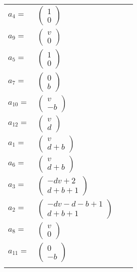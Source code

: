 \documentclass[1p]{elsarticle_modified}
\theoremstyle{definition}
\begin{document}
\begin{tabular}{m{7pt} m{180pt} m{7pt} m{180pt} }
\flushright $a_{4}=$&$\begin{pmatrix}1\\0\end{pmatrix}$ \\
\flushright $a_{9}=$&$\begin{pmatrix}v\\0\end{pmatrix}$ \\
\flushright $a_{5}=$&$\begin{pmatrix}1\\0\end{pmatrix}$ \\
\flushright $a_{7}=$&$\begin{pmatrix}0\\b\end{pmatrix}$ \\
\flushright $a_{10}=$&$\begin{pmatrix}v\\- b\end{pmatrix}$ \\
\flushright $a_{12}=$&$\begin{pmatrix}v\\d\end{pmatrix}$ \\
\flushright $a_{1}=$&$\begin{pmatrix}v\\d+b\end{pmatrix}$ \\
\flushright $a_{6}=$&$\begin{pmatrix}v\\d+b\end{pmatrix}$ \\
\flushright $a_{3}=$&$\begin{pmatrix}- d v+2\\d+b+1\end{pmatrix}$ \\
\flushright $a_{2}=$&$\begin{pmatrix}- d v- d- b+1\\d+b+1\end{pmatrix}$ \\
\flushright $a_{8}=$&$\begin{pmatrix}v\\0\end{pmatrix}$ \\
\flushright $a_{11}=$&$\begin{pmatrix}0\\- b\end{pmatrix}$\\&\end{tabular}
\end{document}
